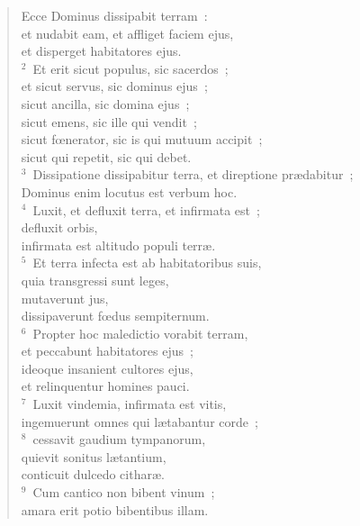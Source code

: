 \begin{flushleft}\begin{verse}\vspace{-19pt}\hspace{6pt}Ecce Dominus dissipabit terram~:\\\hspace{6pt} et nudabit eam, et affliget faciem ejus,\\ et disperget habitatores ejus.\\
${}^{2}$~Et erit sicut populus, sic sacerdos~;\\ et sicut servus, sic dominus ejus~;\\ sicut ancilla, sic domina ejus~;\\ sicut emens, sic ille qui vendit~;\\ sicut fœnerator, sic is qui mutuum accipit~;\\ sicut qui repetit, sic qui debet.\\
${}^{3}$~Dissipatione dissipabitur terra, et direptione pr\ae dabitur~;\\ Dominus enim locutus est verbum hoc.\\
${}^{4}$~Luxit, et defluxit terra, et infirmata est~;\\ defluxit orbis,\\ infirmata est altitudo populi terr\ae .\\
${}^{5}$~Et terra infecta est ab habitatoribus suis,\\ quia transgressi sunt leges,\\ mutaverunt jus,\\ dissipaverunt fœdus sempiternum.\\
${}^{6}$~Propter hoc maledictio vorabit terram,\\ et peccabunt habitatores ejus~;\\ ideoque insanient cultores ejus,\\ et relinquentur homines pauci.\\
${}^{7}$~Luxit vindemia, infirmata est vitis,\\ ingemuerunt omnes qui l\ae tabantur corde~;\\
${}^{8}$~cessavit gaudium tympanorum,\\ quievit sonitus l\ae tantium,\\ conticuit dulcedo cithar\ae .\\
${}^{9}$~Cum cantico non bibent vinum~;\\ amara erit potio bibentibus illam.\\

\end{verse}
\end{flushleft}
